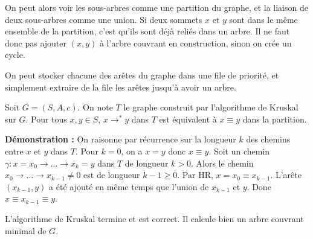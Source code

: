 \documentclass[../../../main.tex]{subfiles}
\begin{document}
On peut alors voir les sous-arbres comme une partition du graphe, et la liaison de deux sous-arbres
comme une union. Si deux sommets $x$ et $y$ sont dans le même ensemble de la partition, c'est qu'ils sont
déjà reliés dans un arbre. Il ne faut donc pas ajouter $(x, y)$ à l'arbre couvrant en construction, sinon on
crée un cycle.

On peut stocker chacune des arêtes du graphe dans une file de priorité, et simplement extraire de la
file les arêtes jusqu'à avoir un arbre.

\lemma{} Soit $G = (S, A, c)$. On note $T$ le graphe construit par l'algorithme de Kruskal sur $G$. Pour
tous $x, y\in S$, $x\rightarrow^* y$ dans $T$ est équivalent à $x\equiv y$ dans la partition.

\textbf{Démonstration :} On raisonne par récurrence sur la longueur $k$ des chemins entre $x$ et $y$ dans $T$. Pour
$k = 0$, on a $x = y$ donc $x\equiv y$. Soit un chemin $\gamma : x = x_0 \rightarrow \dots \rightarrow x_k = y$ dans $T$ de longueur $k > 0$.
Alors le chemin $x_0\rightarrow \dots \rightarrow x_{k-1} \neq 0$ est de longueur $k-1\geq 0$. Par HR, $x = x_0 \equiv x_{k-1}$. L'arête
$(x_{k-1} , y)$ a été ajouté en même temps que l'union de $x_{k-1}$ et $y$. Donc $x\equiv x_{k-1} \equiv y$.

 L'algorithme de Kruskal termine et
est correct. Il calcule bien un arbre couvrant minimal de $G$.
\end{document}

